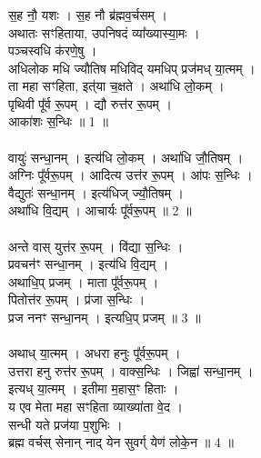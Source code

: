 \subsubsection{}
स॒ह नौ॒ यशः । स॒ह नौ ब्र॑ह्मव॒र्चसम् ।\\
अथातः सꣳहिताया, उपनिषदं व्या᳚ख्यास्या॒मः ।\\
पञ्चस्वधि क॑रणे॒षु ।\\
अधिलोक मधि ज्यौतिष मधिविद् यमधिप् प्रज॑मध् या॒त्मम् ।\\
ता महा सꣳहिता, इत्॑या च॒क्षते । अथा॑धि लो॒कम् ।\\
पृथिवी पू᳚र्व रू॒पम् । द्यौ रुत्त॑र रू॒पम् ।\\
आका॑शः स॒न्धिः ॥ 1 ॥\\
\\
वायुः॑ सन्धा॒नम् । इत्य॑धि लो॒कम् । अथा॑धि जौ॒तिषम् ।\\
अग्निः पू᳚र्वरू॒पम् । आदित्य उत्त॑र रू॒पम् । आ॑पः स॒न्धिः ।\\
वैद्युतः॑ सन्धा॒नम् । इत्य॑धिज् ज्यौ॒तिषम् । \\
अथा॑धि वि॒द्यम् । आचार्यः पू᳚र्वरू॒पम् ॥ 2 ॥\\
\\
अन्ते वास् युत्त॑र रू॒पम् । वि॑द्या स॒न्धिः ।\\
प्रवचन॑ꣳ सन्धा॒नम् । इत्य॑धि वि॒द्यम् । \\
अथाधि॒प् प्रजम् । माता पू᳚र्वरू॒पम् ।\\
पितोत्त॑र रू॒पम् । प्र॑जा स॒न्धिः । \\
प्रज ननꣳ सन्धा॒नम् । इत्यधि॒प् प्रजम् ॥ 3 ॥\\
\\
अथाध् या॒त्मम् । अधरा हनुः पू᳚र्वरू॒पम् ।\\
उत्तरा हनु रुत्त॑र रू॒पम् । वाक्स॒न्धिः । जिह्वा॑ सन्धा॒नम् ।\\
इत्यध् या॒त्मम् । इतीमा म॒हास॒ꣳ हिताः ।\\
य एव मेता महा सꣳहिता व्याख्या॑ता वे॒द ।\\
सन्धी यते प्रज॑या प॒शुभिः ।\\
ब्रह्म वर्चस् सेनान् नाद् येन सुवर्ग् येण॑ लोके॒न ॥ 4 ॥\\
